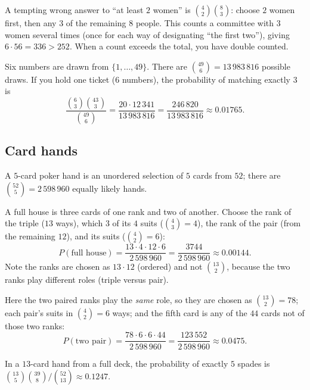 \begin{important}
A tempting wrong answer to ``at least $2$ women'' is $\binom42\binom83$: choose $2$ women
first, then any $3$ of the remaining $8$ people. This counts a committee with $3$ women
several times (once for each way of designating ``the first two''), giving
$6\cdot 56 = 336 > 252$. When a count exceeds the total, you have double counted.
\end{important}

\begin{example}[Lotto 6/49]
Six numbers are drawn from $\{1,\dots,49\}$. There are $\binom{49}{6} = 13\,983\,816$
possible draws. If you hold one ticket (6 numbers), the probability of matching exactly
$3$ is
\[
  \frac{\binom63\binom{43}{3}}{\binom{49}6} = \frac{20 \cdot 12\,341}{13\,983\,816}
  = \frac{246\,820}{13\,983\,816} \approx 0.01765.
\]
\end{example}

\subsection{Card hands}

A $5$-card poker hand is an unordered selection of $5$ cards from $52$; there are
$\binom{52}{5} = 2\,598\,960$ equally likely hands.

\begin{example}
A full house is three cards of one rank and two of another. Choose the rank of the triple
($13$ ways), which $3$ of its $4$ suits ($\binom43 = 4$), the rank of the pair (from the
remaining $12$), and its suits ($\binom42 = 6$):
\[
  P(\text{full house}) = \frac{13\cdot 4 \cdot 12 \cdot 6}{2\,598\,960} =
  \frac{3744}{2\,598\,960} \approx 0.00144.
\]
Note the ranks are chosen as $13\cdot 12$ (ordered) and not $\binom{13}{2}$, because the
two ranks play different roles (triple versus pair).
\end{example}

\begin{example}
Here the two paired ranks play the \emph{same} role, so they are chosen as
$\binom{13}{2} = 78$; each pair's suits in $\binom42 = 6$ ways; and the fifth card is any
of the $44$ cards not of those two ranks:
\[
  P(\text{two pair}) = \frac{78\cdot 6\cdot 6\cdot 44}{2\,598\,960} =
  \frac{123\,552}{2\,598\,960} \approx 0.0475.
\]
\end{example}

\begin{example}
In a $13$-card hand from a full deck, the probability of exactly $5$ spades is
$\binom{13}{5}\binom{39}{8}/\binom{52}{13} \approx 0.1247$.
\end{example}

